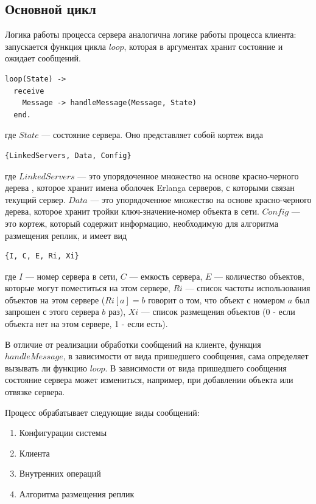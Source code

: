 		\subsection{Основной цикл}
			Логика работы процесса сервера аналогична логике работы процесса клиента: запускается функция цикла $loop$, которая в аргументах хранит состояние и ожидает сообщений.
			\begin{lstlisting}
loop(State) ->
  receive
    Message -> handleMessage(Message, State)
  end.		
			\end{lstlisting}
			где $State$ --- состояние сервера. Оно представляет собой кортеж вида
			\begin{lstlisting}
{LinkedServers, Data, Config}			
			\end{lstlisting}
			где $LinkedServers$ --- это упорядоченное множество на основе красно-черного дерева \cite{osetR}, которое хранит имена оболочек Erlanga серверов, с которыми связан текущий сервер.
			$Data$ --- это упорядоченное множество на основе красно-черного дерева, которое хранит тройки ключ-значение-номер объекта в сети. $Config$ --- это кортеж, который содержит 
			информацию, необходимую для алгоритма размещения реплик, и имеет вид
			\begin{lstlisting}
{I, C, E, Ri, Xi}			
			\end{lstlisting}
			где $I$ --- номер сервера в сети, $C$ --- емкость сервера, $E$ --- количество объектов, которые могут поместиться на этом сервере, $Ri$ --- список частоты использования
			объектов на этом сервере ($Ri[a] = b$ говорит о том, что объект с номером $a$ был запрошен с этого сервера $b$ раз), $Xi$ --- список размещения 
			объектов (0 - если объекта нет на этом сервере, 1 - если есть).

			В отличие от реализации обработки сообщений на клиенте, функция $handleMessage$, в зависимости от вида пришедшего сообщения, сама определяет вызывать ли функцию
			$loop$. В зависимости от вида пришедшего сообщения состояние сервера может измениться, например, при добавлении объекта или отвязке сервера.

			Процесс обрабатывает следующие виды сообщений:
			\begin{enumerate}
				\item Конфигурации системы
				\item Клиента 
				\item Внутренних операций
				\item Алгоритма размещения реплик
			\end{enumerate}

